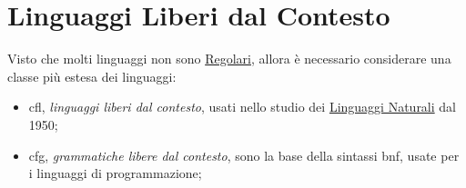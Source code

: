 \chapter{Linguaggi Liberi dal Contesto}\label{chap:ll_linguaggi_liberi_dal_contesto} %
Visto che molti linguaggi non sono \hyperref[def:ling-reg]{Regolari}, allora è necessario considerare una classe più estesa dei linguaggi:
\begin{itemize}
    \item \ac{cfl}, \textit{linguaggi liberi dal contesto}, usati nello studio dei \hyperref[sec:i_linguaggi_naturali]{Linguaggi Naturali} dal 1950;
    \item \ac{cfg}, \textit{grammatiche libere dal contesto}, sono la base della sintassi \ac{bnf}, usate per i linguaggi di programmazione;
\end{itemize}
%
